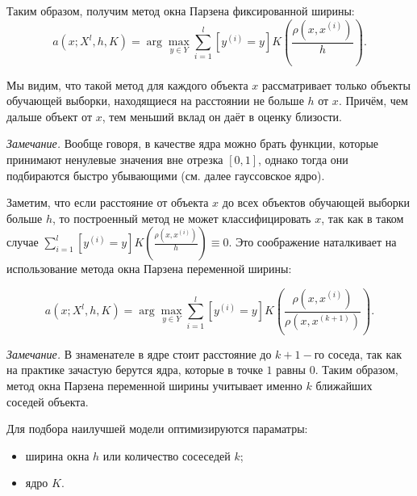 Таким образом, получим метод окна Парзена фиксированной ширины:
\begin{equation*}
	\displaystyle a(x; X^l, h, K) = \arg\max_{y\in Y} \sum\limits_{i=1}^l[y^{(i)}=y]K\left(\frac{\rho(x, x^{(i)})}{h}\right). 
\end{equation*}

Мы видим, что такой метод для каждого объекта $x$ рассматривает только объекты обучающей выборки, находящиеся на расстоянии не больше $h$ от $x$. Причём, чем дальше объект от $x$, тем  меньший вклад он даёт в оценку близости.

\textit{Замечание.} Вообще говоря, в качестве ядра можно брать функции, которые принимают ненулевые значения вне отрезка $[0,1]$, однако тогда они подбираются быстро убывающими (см. далее гауссовское ядро).

Заметим, что если расстояние от объекта $x$ до всех объектов обучающей выборки больше $h$, то построенный метод не может классифицировать $x$, так как в таком случае $\displaystyle\sum\limits_{i=1}^l[y^{(i)}=y]K\left(\frac{\rho(x, x^{(i)})}{h}\right) \equiv 0$. Это соображение наталкивает на использование метода окна Парзена переменной ширины:

\begin{equation*}
	\displaystyle a(x; X^l, h, K) = \arg\max_{y\in Y} \sum\limits_{i=1}^l[y^{(i)}=y]K\left(\frac{\rho(x, x^{(i)})}{\rho(x, x^{(k+1)})}\right). 
\end{equation*}

\textit{Замечание.} В знаменателе в ядре стоит расстояние до $k+1-$го соседа, так как на практике зачастую берутся ядра, которые в точке $1$ равны $0$. Таким образом, метод окна Парзена переменной ширины учитывает именно $k$ ближайших соседей объекта.

Для подбора наилучшей модели оптимизируются параматры:
\begin{itemize}
	\item ширина окна $h$ или количество сосеседей $k$;
	\item ядро $K$.
\end{itemize}

